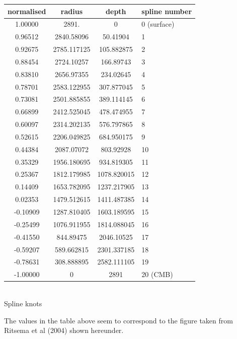 \begin{center}
\begin{tabular}{cccl}
\hline 
normalised & radius & depth & spline number\\
\hline 
\hline 
1.00000  & 2891.        &  0            & 0 (surface)\\
0.96512  & 2840.58096   &  50.41904     & 1\\
0.92675  & 2785.117125  &  105.882875   & 2\\
0.88454  & 2724.10257   &  166.89743    & 3\\
0.83810  & 2656.97355   &  234.02645    & 4\\
0.78701  & 2583.122955  &  307.877045   & 5\\
0.73081  & 2501.885855  &  389.114145   & 6\\
0.66899  & 2412.525045  &  478.474955   & 7\\
0.60097  & 2314.202135  &  576.797865   & 8\\
0.52615  & 2206.049825  &  684.950175   & 9\\
0.44384  & 2087.07072   &  803.92928    & 10\\
0.35329  & 1956.180695  &  934.819305   & 11\\
0.25367  & 1812.179985  &  1078.820015  & 12\\
0.14409  & 1653.782095  &  1237.217905  & 13\\
0.02353  & 1479.512615  &  1411.487385  & 14\\
-0.10909 & 1287.810405  &  1603.189595  & 15\\
-0.25499 & 1076.911955  &  1814.088045  & 16\\
-0.41550 & 844.89475    &  2046.10525   & 17\\
-0.59207 & 589.662815   &  2301.337185  & 18\\
-0.78631 & 308.888895   &  2582.111105  & 19\\
-1.00000 & 0            &  2891         & 20  (CMB) \\
\hline
\end{tabular}\\
{\captionfont Spline knots}
\end{center}

The values in the table above seem to correspond to the figure taken from 
Ritsema et al (2004) \cite{rivw04} shown hereunder. 

